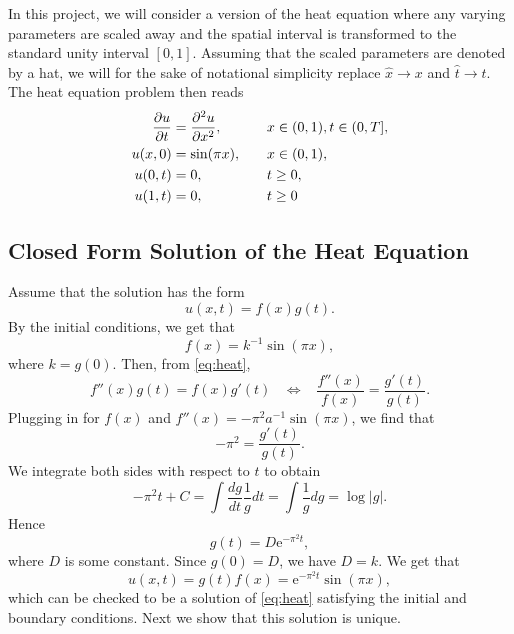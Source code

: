 In this project, we will consider a version of the heat equation where any varying parameters are scaled away and the spatial interval is transformed to the standard unity interval $[0,1]$. Assuming that the scaled parameters are denoted by a hat, we will for the sake of notational simplicity replace $\hat{x}\to x$ and $\hat{t} \to t$. The heat equation problem then reads
\begin{alignat}{2}
    \pdv{u}{t} &= \pdv[2]{u}{x}, \quad &&x \in (0,1), t\in (0, T], \label{eq:heat}\\
    u(x,0) &= \sin(\pi x), \quad &&x\in (0,1), \\
    u(0,t) &= 0, \quad &&t \geq 0, \\
    u(1,t) &= 0, \quad &&t \geq 0
\end{alignat}


\subsection{Closed Form Solution of the Heat Equation}\label{sec:Heat analytic Theory}

Assume that the solution has the form
\begin{equation*}
    u(x,t)=f(x)g(t).
\end{equation*}
By the initial conditions, we get that
\begin{equation*}
    f(x)=k^{-1}\sin(\pi x),
\end{equation*}
where $k=g(0)$. Then, from \cref{eq:heat},
\begin{equation*}
    f''(x)g(t) = f(x)g'(t)\;\;\;\Leftrightarrow\;\;\;\frac{f''(x)}{f(x)}=\frac{g'(t)}{g(t)}.
\end{equation*}
Plugging in for $f(x)$ and $f''(x)=-\pi^2a^{-1}\sin(\pi x)$, we find that
\begin{equation*}
    -\pi^2 = \frac{g'(t)}{g(t)}.
\end{equation*}
We integrate both sides with respect to $t$ to obtain
\begin{equation*}
    -\pi^2t+C = \int\frac{dg}{dt}\frac{1}{g}dt = \int\frac{1}{g}dg =\log |g|.
\end{equation*}
Hence
\begin{equation*}
    g(t)=D\mathrm{e}^{-\pi^2 t},
\end{equation*}
where $D$ is some constant. Since $g(0)=D$, we have $D=k$. We get that
\begin{equation*}
    u(x,t)=g(t)f(x)=\mathrm{e}^{-\pi^2 t}\sin(\pi x),
\end{equation*}
which can be checked to be a solution of \cref{eq:heat} satisfying the initial and boundary conditions. Next we show that this solution is unique.


